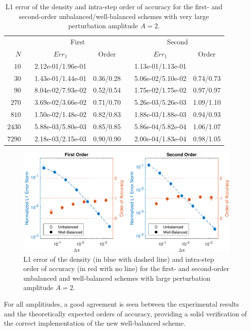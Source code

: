\begin{table}\centering
\caption{L1 error of the density and intra-step order of accuracy for the first- and second-order unbalanced/well-balanced schemes with very large perturbation amplitude $A=2$.}
\label{table:OVS_Alarge}
\begin{tabular}{@{}rcccccc@{}}\toprule
& \phantom{a} & \multicolumn{2}{c}{First} & \phantom{ab} & \multicolumn{2}{c}{Second}\\
\cmidrule{3-4} \cmidrule{6-7}
$N$ && $Err_1$ & Order && $Err_1$ & Order\\ \midrule
$10$ && 2.12e-01/1.96e-01 &&& 1.13e-01/1.13e-01 &\\
$30$ && 1.43e-01/1.44e-01 & 0.36/0.28 && 5.06e-02/5.10e-02 & 0.74/0.73\\
$90$ && 8.04e-02/7.93e-02 & 0.52/0.54 && 1.75e-02/1.75e-02 & 0.97/0.97\\
$270$ && 3.69e-02/3.66e-02 & 0.71/0.70 && 5.26e-03/5.26e-03 & 1.09/1.10\\
$810$ && 1.50e-02/1.48e-02 & 0.82/0.83 && 1.88e-03/1.88e-03 & 0.94/0.93\\
$2430$ && 5.88e-03/5.80e-03 & 0.85/0.85 && 5.86e-04/5.82e-04 & 1.06/1.07\\
$7290$ && 2.18e-03/2.15e-03 & 0.90/0.90 && 2.00e-04/1.83e-04 & 0.98/1.05\\
\bottomrule
\end{tabular}
\end{table}

\begin {figure}
\centering
\includegraphics[width=13cm]{figures/OVSeps2}
\caption {L1 error of the density (in blue with dashed line) and intra-step order of accuracy (in red with no line) for the first- and second-order unbalanced and well-balanced schemes with large perturbation amplitude $A=2$.}
\label{fig:OVS_Alarge}
\end{figure}

For all amplitiudes, a good agreement is seen between the experimental results and the theoretically expected orders of accuracy, providing a solid verification of the correct implementation of the new well-balanced scheme.
